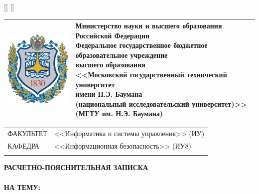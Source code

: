 \StrLen{\RPZTitleStudent}[\StudentLen]
\StrLen{\RPZTitleTeacher}[\TeacherLen]
\ifthenelse{\StudentLen > \TeacherLen}{\StrLen{\RPZTitleStudent}[\SignLen]}{\StrLen{\RPZTitleTeacher}[\SignLen]}

\pagestyle{empty}
\noindent
\begin{tabularx}{\textwidth}{L{2cm} C{\textwidth - 2.7cm}}
    \includegraphics[scale=1]{inc/img/bmstu.jpg} &
    {\centering\rmfamily\bfseries\fontsize{11pt}{11pt}\selectfont
    Министерство науки и высшего образования Российской Федерации \\
    Федеральное государственное бюджетное образовательное учреждение \\
    высшего образования \\
    <<Московский государственный технический университет \\
    имени Н.Э. Баумана \\
    (национальный исследовательский университет)>>\\
    (МГТУ им. Н.Э. Баумана)}\\
    \bottomrule[2pt]
    \bottomrule
\end{tabularx}

\noindent
\begin{tabularx}{\textwidth}{lX}
{\fontsize{12pt}{12pt}\selectfont ФАКУЛЬТЕТ}
    &
    {\fontsize{12pt}{12pt}\selectfont <<Информатика и системы управления>> (ИУ)}\\
    \hhline{~~}
    {\fontsize{12pt}{12pt}\selectfont КАФЕДРА} &
    {\fontsize{12pt}{12pt}\selectfont <<Информационная безопасность>> (ИУ8)}\\
    \hhline{~~}
\end{tabularx}
\vfill


\noindent
{\centering\rmfamily\bfseries\fontsize{20pt}{20pt}\selectfont
РАСЧЕТНО-ПОЯСНИТЕЛЬНАЯ ЗАПИСКА \\ \bigskip
\MakeTextUppercase{\RPZTitle} \\ \bigskip
НА ТЕМУ: \\ \bigskip
}



